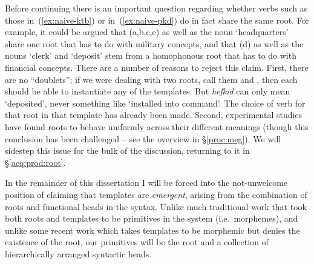 Before continuing there is an important question regarding whether verbs such as those in~(\ref{ex:naive-ktb}) or in~(\ref{ex:naive-pkd}) do in fact share the same root. For example, it could be argued that (\lastx a,b,c,e) as well as the noun `headquarters' share one root that has to do with military concepts, and that (\lastx d) as well as the nouns `clerk' and `deposit' stem from a homophonous root that has to do with financial concepts. There are a number of reasons to reject this claim. First, there are no ``doublets''; if we were dealing with two roots, call them  and , then each should be able to instantiate any of the templates. But \emph{hefkid} can only mean `deposited', never something like `installed into command'. The choice of verb for that root in that template has already been made. Second, experimental {studies} have found roots to behave uniformly across their different meanings (though this conclusion has been challenged{ -- see the overview in \S\ref{proc:meg}}). We will sidestep this issue for the bulk of the discussion, returning to it in \S\ref{acq:prod:root}.

In the remainder of this dissertation I will be forced into the not-unwelcome position of claiming that templates are \emph{emergent}, arising from the combination of roots and functional heads in the syntax. Unlike much traditional work that took both roots and templates to be primitives in the system (i.e.~morphemes), and unlike some recent work which takes templates to be morphemic but denies the existence of the root, our primitives will be the root and a collection of hierarchically arranged syntactic heads.

